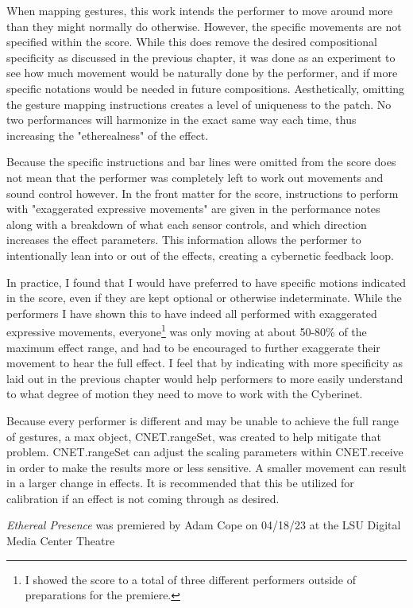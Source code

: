 When mapping gestures, this work intends the performer to move around more than they might normally do otherwise. However, the specific movements are not specified within the score. While this does remove the desired compositional specificity as discussed in the previous chapter, it was done as an experiment to see how much movement would be naturally done by the performer, and if more specific notations would be needed in future compositions. Aesthetically, omitting the gesture mapping instructions creates a level of uniqueness to the patch. No two performances will harmonize in the exact same way each time, thus increasing the "etherealness" of the effect.

Because the specific instructions and bar lines were omitted from the score does not mean that the performer was completely left to work out movements and sound control however. In the front matter for the score, instructions to perform with "exaggerated expressive movements" are given in the performance notes along with a breakdown of what each sensor controls, and which direction increases the effect parameters. This information allows the performer to intentionally lean into or out of the effects, creating a cybernetic feedback loop.

In practice, I found that I would have preferred to have specific motions indicated in the score, even if they are kept optional or otherwise indeterminate. While the performers I have shown this to have indeed all performed with exaggerated expressive movements, everyone\footnote{I showed the score to a total of three different performers outside of preparations for the premiere.} was only moving at about 50-80\% of the maximum effect range, and had to be encouraged to further exaggerate their movement to hear the full effect. I feel that by indicating with more specificity as laid out in the previous chapter would help performers to more easily understand to what degree of motion they need to move to work with the Cyberinet. 

Because every performer is different and may be unable to achieve the full range of gestures, a max object, CNET.rangeSet, was created to help mitigate that problem. CNET.rangeSet can adjust the scaling parameters within CNET.receive in order to make the results more or less sensitive. A smaller movement can result in a larger change in effects. It is recommended that this be utilized for calibration if an effect is not coming through as desired.


\textit{Ethereal Presence} was premiered by Adam Cope on 04/18/23 at the LSU Digital Media Center Theatre

